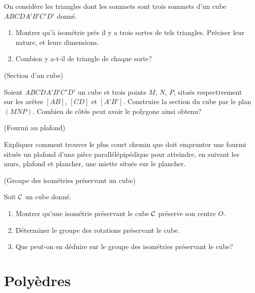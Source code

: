 \documentclass[a4paper,11pt,reqno]{amsart}
\begin{document}
\begin{exo}

  On considère les triangles dont les sommets sont trois sommets d'un cube $ABCDA'B'C'D'$ donné.
  \begin{enumerate}
    \item Montrer qu'à isométrie près il y a trois sortes de tels triangles. Préciser leur nature, et leurs dimensions.
    \item Combien y a-t-il de triangle de chaque sorte?
  \end{enumerate}
\end{exo}

\begin{exo}[.7] (Section d'un cube)

  Soient $ABCDA'B'C'D'$ un cube et trois points $M$, $N$, $P$, situés respectivement sur les arêtes $[AB]$, $[CD]$ et $[A'B']$. Construire la section du cube par le plan $(MNP)$. Combien de côtés peut avoir le polygone ainsi obtenu?
\end{exo}

\begin{exo}[.7] (Fourmi au plafond)

  Expliquer comment trouver le plus court chemin que doit emprunter une fourmi située un plafond d'une pièce parallélépipédique pour atteindre, en suivant les murs, plafond et plancher, une miette située sur le plancher.
\end{exo}


\begin{exo} (Groupe des isométries préservant un cube)

  Soit $\mathcal{C}$ un cube donné.
  \begin{enumerate}
    \item Montrer qu'une isométrie préservant le cube $\mathcal{C}$ préserve son centre $O$.
    \item Déterminer le groupe des rotations préservant le cube.
    \item Que peut-on en déduire sur le groupe des isométries préservant le cube?
  \end{enumerate}
\end{exo}


\section{Polyèdres}
\end{document}
